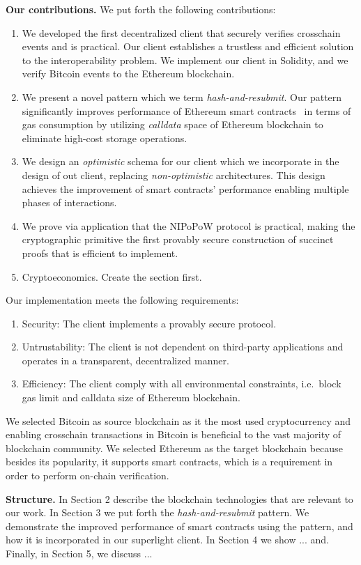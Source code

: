 \textbf{Our contributions.} We put forth the following contributions:
\begin{enumerate}
\item We developed the first decentralized client that securely verifies
crosschain events and is practical. Our client establishes a trustless and
efficient solution to the interoperability problem. We implement our client
in Solidity, and we verify Bitcoin events to the Ethereum blockchain.
\item We present a novel pattern which we term \emph{hash-and-resubmit}. Our
pattern significantly improves performance of Ethereum smart
contracts~\cite{wood, buterin} in terms of gas consumption by utilizing
\emph{calldata} space of Ethereum blockchain to eliminate high-cost storage
operations.
\item We design an \emph{optimistic} schema for our client which we incorporate in
the design of out client, replacing \emph{non-optimistic} architectures.
This design achieves the improvement of smart contracts' performance enabling
multiple phases of interactions.
\item We prove via application that the NIPoPoW protocol is practical, making
the cryptographic primitive the first provably secure construction of succinct
proofs that is efficient to implement.
\item Cryptoeconomics. Create the section first.

\end{enumerate}

Our implementation meets the following requirements:
\begin{enumerate}
\item Security: The client implements a provably secure protocol.
\item Untrustability: The client is not dependent on third-party applications
and operates in a transparent, decentralized manner.
\item Efficiency: The client comply with all environmental constraints, i.e.\
block gas limit and calldata size of Ethereum blockchain.
\end{enumerate}

We selected Bitcoin as source blockchain as it the most used cryptocurrency and
enabling crosschain transactions in Bitcoin is beneficial to the vast majority
of blockchain community. We selected Ethereum as the target blockchain because
besides its popularity, it supports smart contracts, which is a requirement
in order to perform on-chain verification.

\noindent

\textbf{Structure.} In Section 2 describe the blockchain technologies that are
relevant to our work. In Section 3 we put forth the \emph{hash-and-resubmit}
pattern. We demonstrate the improved performance of smart contracts using the
pattern, and how it is incorporated in our superlight client. In Section 4 we
show ... and.  Finally, in Section 5, we discuss ...
